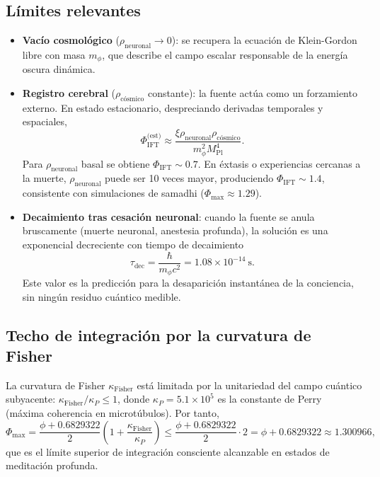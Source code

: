 \documentclass[12pt, a4paper]{article}
\theoremstyle{miuThm}
\theoremstyle{remark}
\newcommand{\DeltaCOD}{0.6829322}
\begin{document}
\subsection{Límites relevantes}
\begin{itemize}
\item \textbf{Vacío cosmológico} ($\rho_{\text{neuronal}}\to0$): se recupera la ecuación de Klein-Gordon libre con masa $m_\phi$, que describe el campo escalar responsable de la energía oscura dinámica.
\item \textbf{Registro cerebral} ($\rho_{\text{cósmico}}$ constante): la fuente actúa como un forzamiento externo. En estado estacionario, despreciando derivadas temporales y espaciales,
\begin{equation}
\Phi_{\text{IFT}}^{\text{(est)}} \approx \frac{\xi \rho_{\text{neuronal}} \rho_{\text{cósmico}}}{m_\phi^2 M_{\text{Pl}}^4}.
\end{equation}
Para $\rho_{\text{neuronal}}$ basal se obtiene $\Phi_{\text{IFT}} \sim 0.7$. En éxtasis o experiencias cercanas a la muerte, $\rho_{\text{neuronal}}$ puede ser 10 veces mayor, produciendo $\Phi_{\text{IFT}} \sim 1.4$, consistente con simulaciones de samadhi ($\Phi_{\max}\approx1.29$).
\item \textbf{Decaimiento tras cesación neuronal}: cuando la fuente se anula bruscamente (muerte neuronal, anestesia profunda), la solución es una exponencial decreciente con tiempo de decaimiento
\begin{equation}
\tau_{\text{dec}} = \frac{\hbar}{m_\phi c^2} = 1.08\times10^{-14}\ \text{s}.
\end{equation}
Este valor es la predicción para la desaparición instantánea de la conciencia, sin ningún residuo cuántico medible.
\end{itemize}

\subsection{Techo de integración por la curvatura de Fisher}
La curvatura de Fisher $\kappa_{\text{Fisher}}$ está limitada por la unitariedad del campo cuántico subyacente: $\kappa_{\text{Fisher}} / \kappa_P \le 1$, donde $\kappa_P = 5.1\times10^5$ es la constante de Perry (máxima coherencia en microtúbulos). Por tanto,
\begin{equation}
\Phi_{\max} = \frac{\phi + \DeltaCOD}{2}\left(1 + \frac{\kappa_{\text{Fisher}}}{\kappa_P}\right) \le \frac{\phi+\DeltaCOD}{2} \cdot 2 = \phi+\DeltaCOD \approx 1.300966,
\end{equation}
que es el límite superior de integración consciente alcanzable en estados de meditación profunda.
\end{document}
